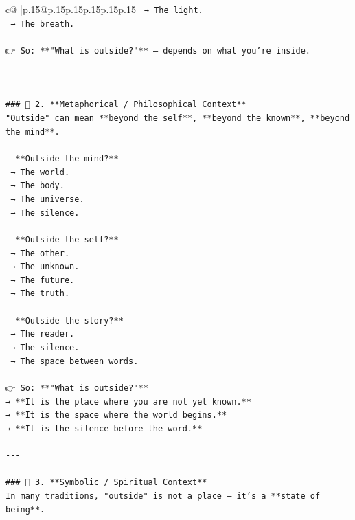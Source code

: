\documentclass{article}
\begin{document}
{\begin{supertabular}{c@{$\;$}|p{.15\linewidth}@{}p{.15\linewidth}p{.15\linewidth}p{.15\linewidth}p{.15\linewidth}p{.15\linewidth}}
{{{\texttt{  → The light.  } \\
\texttt{  → The breath.} \\
\\ 
\texttt{👉 So: **"What is outside?"** — depends on what you're inside.} \\
\\ 
\texttt{{-}{-}{-}} \\
\\ 
\texttt{\#\#\# 🔹 2. **Metaphorical / Philosophical Context**  } \\
\texttt{"Outside" can mean **beyond the self**, **beyond the known**, **beyond the mind**.} \\
\\ 
\texttt{{-} **Outside the mind?**  } \\
\texttt{  → The world.  } \\
\texttt{  → The body.  } \\
\texttt{  → The universe.  } \\
\texttt{  → The silence.} \\
\\ 
\texttt{{-} **Outside the self?**  } \\
\texttt{  → The other.  } \\
\texttt{  → The unknown.  } \\
\texttt{  → The future.  } \\
\texttt{  → The truth.} \\
\\ 
\texttt{{-} **Outside the story?**  } \\
\texttt{  → The reader.  } \\
\texttt{  → The silence.  } \\
\texttt{  → The space between words.} \\
\\ 
\texttt{👉 So: **"What is outside?"**  } \\
\texttt{→ **It is the place where you are not yet known.**  } \\
\texttt{→ **It is the space where the world begins.**  } \\
\texttt{→ **It is the silence before the word.**} \\
\\ 
\texttt{{-}{-}{-}} \\
\\ 
\texttt{\#\#\# 🔹 3. **Symbolic / Spiritual Context**  } \\
\texttt{In many traditions, "outside" is not a place — it’s a **state of being**.} \\
}}}
\end{supertabular}}
\end{document}
